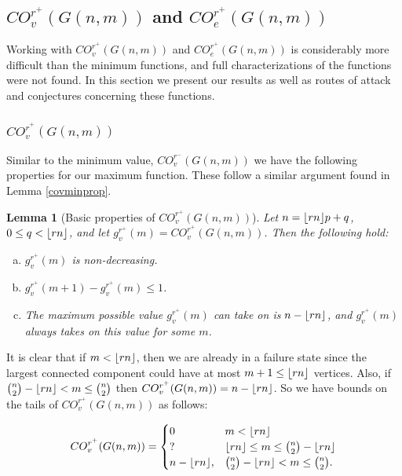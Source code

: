 \documentclass[12pt]{article}
\DeclarePairedDelimiter{\floor}{\lfloor}{\rfloor}
\newtheorem{lemma}[theorem]{Lemma}
\theoremstyle{definition}
\newcommand{\COVMAX}[1]{CO^{r^+}_{v}(#1)}
\newcommand{\COEMAX}[1]{CO^{r^+}_{e}(#1)}
\newcommand{\COVMIN}[1]{CO^{r^-}_{v}(#1)}
\newcommand{\gvMAX}[1]{g_{v}^{r^+}(#1)}
\begin{document}
\subsection{$\COVMAX{G(n,m)}$ and $\COEMAX{G(n,m)}$}

Working with $\COVMAX{G(n,m)}$ and $\COEMAX{G(n,m)}$ is considerably more difficult than the minimum functions, and full characterizations of the functions were not found. In this section we present our results as well as routes of attack and conjectures concerning these functions. 

\subsubsection{$\COVMAX{G(n,m)}$}

Similar to the minimum value, $\COVMIN{G(n,m)}$ we have the following properties for our maximum function. These follow a similar argument found in Lemma \ref{covminprop}. 

\begin{lemma}[Basic properties of $\COVMAX{G(n,m)}$]
Let $n=\floor{rn}p+q$, $0\le q < \floor{rn}$, and let $\gvMAX{m}=\COVMAX{G(n,m)}$. Then the following hold:
\begin{enumerate}[(a)]
  \item $\gvMAX{m}$ is non-decreasing.
  \item $\gvMAX{m+1}-\gvMAX{m} \leq 1$.
  \item The maximum possible value $\gvMAX{m}$ can take on is $n-\floor{rn}$, and $\gvMAX{m}$ always takes on this value for some $m$.
\end{enumerate}
\end{lemma}

It is clear that if $m<\floor{rn}$, then we are already in a failure state since the largest connected component could have at most $m+1 \leq \floor{rn}$ vertices. 
Also, if ${n \choose 2} - \floor{rn} < m \le {n \choose 2}$ then $\COVMAX{G(n,m)} = n-\floor{rn}$. So we have bounds on the tails of $\COVMAX{G(n,m)}$ as follows: 

$$\COVMAX{G(n,m)} =
\begin{cases}
   0 &m<\floor{rn}\\
   ? &\floor{rn} \leq m \leq {n \choose 2} - \floor{rn}\\
   n-\floor{rn}, &{n \choose 2} - \floor{rn} < m \le {n \choose 2}.
\end{cases}
$$

\end{document}
